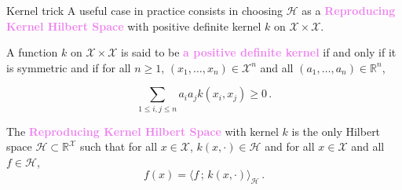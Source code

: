 \documentclass[9pt]{beamer}
\begin{document}
\begin{frame}{Kernel trick}
A useful case in practice consists in choosing $\mathcal{H}$ as a \textcolor{violet}{{\bf Reproducing Kernel Hilbert Space}} with positive definite kernel $k$ on $\mathcal{X}\times \mathcal{X}$.

\vspace{.3cm}

A function $k$ on $\mathcal{X}\times \mathcal{X}$ is said to be \textcolor{violet}{{\bf a positive definite kernel}} if and only if it is symmetric and if for all $n\geqslant 1$, $(x_1,\ldots,x_n)\in\mathcal{X}^n$ and all $(a_1,\ldots,a_n)\in\mathbb{R}^n$,

\vspace{.15cm}

\[
\sum_{1\leqslant i,j\leqslant n}a_ia_jk(x_i,x_j) \geqslant 0\,.
\]

\vspace{.3cm}

The \textcolor{violet}{{\bf Reproducing Kernel Hilbert Space}} with kernel $k$ is the only Hilbert space $\mathcal{H} \subset \mathbb{R}^\mathcal{X}$ such that for all $x\in\mathcal{X}$,  $k(x,\cdot) \in \mathcal{H}$ and for all $x\in\mathcal{X}$ and all $f\in\mathcal{H}$,
\[
f(x) = \langle f\,;\, k(x,\cdot)\rangle_\mathcal{H}\,.
\]

\end{frame}
\end{document}
